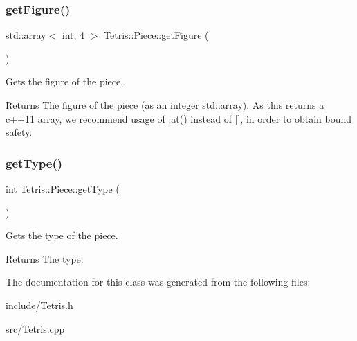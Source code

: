 \subsubsection{\texorpdfstring{get\+Figure()}{getFigure()}}
{\footnotesize\ttfamily std\+::array$<$ int, 4 $>$ Tetris\+::\+Piece\+::get\+Figure (\begin{DoxyParamCaption}{ }\end{DoxyParamCaption})}



Gets the figure of the piece. 

\begin{DoxyReturn}{Returns}
The figure of the piece (as an integer std\+::array). As this returns a c++11 array, we recommend usage of .at() instead of \mbox{[}\mbox{]}, in order to obtain bound safety. 
\end{DoxyReturn}
\mbox{\label{classTetris_1_1Piece_a9d73e1c773c17d96fce8a84e7bf0b1bb}} 
\subsubsection{\texorpdfstring{get\+Type()}{getType()}}
{\footnotesize\ttfamily int Tetris\+::\+Piece\+::get\+Type (\begin{DoxyParamCaption}{ }\end{DoxyParamCaption})}



Gets the type of the piece. 

\begin{DoxyReturn}{Returns}
The type. 
\end{DoxyReturn}


The documentation for this class was generated from the following files\+:\begin{DoxyCompactItemize}
\item 
include/Tetris.\+h\item 
src/Tetris.\+cpp\end{DoxyCompactItemize}
